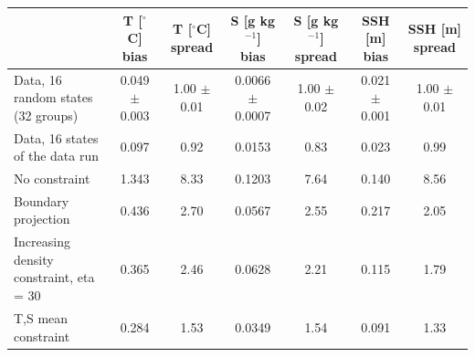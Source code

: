 % 
% 
% 
\begin{tabular}{lcccccc}
\toprule
 & T [$^\circ$C] bias & T [$^\circ$C] spread & S [g kg$^{-1}$] bias & S [g kg$^{-1}$] spread & SSH [m] bias & SSH [m] spread \\
\midrule
Data, 16 random states (32 groups) & 0.049 $\pm$ 0.003 & 1.00 $\pm$ 0.01 & 0.0066 $\pm$ 0.0007 & 1.00 $\pm$ 0.02 & 0.021 $\pm$ 0.001 & 1.00 $\pm$ 0.01 \\
Data, 16 states of the data run & 0.097 & 0.92 & 0.0153 & 0.83 & 0.023 & 0.99 \\
No constraint & 1.343 & 8.33 & 0.1203 & 7.64 & 0.140 & 8.56 \\
Boundary projection & 0.436 & 2.70 & 0.0567 & 2.55 & 0.217 & 2.05 \\
Increasing density constraint, eta = 30 & 0.365 & 2.46 & 0.0628 & 2.21 & 0.115 & 1.79 \\
T,S mean constraint & 0.284 & 1.53 & 0.0349 & 1.54 & 0.091 & 1.33 \\
\bottomrule
\end{tabular}
